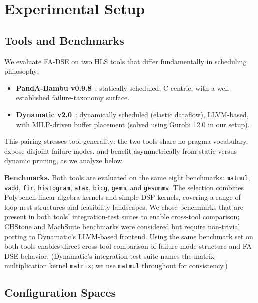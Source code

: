 \documentclass[journal]{IEEEtran}
\begin{document}
\section{Experimental Setup}
\label{sec:setup}

\subsection{Tools and Benchmarks}

We evaluate FA-DSE on two HLS tools that differ fundamentally in scheduling philosophy:
\begin{itemize}
    \item \textbf{PandA-Bambu v0.9.8}~\cite{pilato2013bambu}: statically scheduled, C-centric, with a well-established failure-taxonomy surface.
    \item \textbf{Dynamatic v2.0}~\cite{josipovic2018dynamically}: dynamically scheduled (elastic dataflow), LLVM-based, with MILP-driven buffer placement (solved using Gurobi 12.0 in our setup).
\end{itemize}
This pairing stresses tool-generality: the two tools share no pragma vocabulary, expose disjoint failure modes, and benefit asymmetrically from static versus dynamic pruning, as we analyze below.

\textbf{Benchmarks.} Both tools are evaluated on the same eight benchmarks: \texttt{matmul}, \texttt{vadd}, \texttt{fir}, \texttt{histogram}, \texttt{atax}, \texttt{bicg}, \texttt{gemm}, and \texttt{gesummv}. The selection combines Polybench linear-algebra kernels and simple DSP kernels, covering a range of loop-nest structures and feasibility landscapes. We chose benchmarks that are present in both tools' integration-test suites to enable cross-tool comparison; CHStone and MachSuite benchmarks were considered but require non-trivial porting to Dynamatic's LLVM-based frontend. Using the same benchmark set on both tools enables direct cross-tool comparison of failure-mode structure and FA-DSE behavior. (Dynamatic's integration-test suite names the matrix-multiplication kernel \texttt{matrix}; we use \texttt{matmul} throughout for consistency.)

\subsection{Configuration Spaces}
\end{document}
